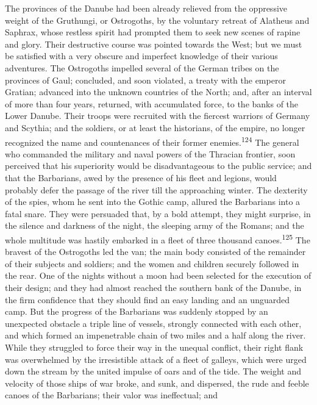 The provinces of the Danube had been already relieved from the
oppressive weight of the Gruthungi, or Ostrogoths, by the
voluntary retreat of Alatheus and Saphrax, whose restless spirit
had prompted them to seek new scenes of rapine and glory. Their
destructive course was pointed towards the West; but we must be
satisfied with a very obscure and imperfect knowledge of their
various adventures. The Ostrogoths impelled several of the German
tribes on the provinces of Gaul; concluded, and soon violated, a
treaty with the emperor Gratian; advanced into the unknown
countries of the North; and, after an interval of more than four
years, returned, with accumulated force, to the banks of the
Lower Danube. Their troops were recruited with the fiercest
warriors of Germany and Scythia; and the soldiers, or at least
the historians, of the empire, no longer recognized the name and
countenances of their former enemies.\textsuperscript{124} The general who
commanded the military and naval powers of the Thracian frontier,
soon perceived that his superiority would be disadvantageous to
the public service; and that the Barbarians, awed by the presence
of his fleet and legions, would probably defer the passage of the
river till the approaching winter. The dexterity of the spies,
whom he sent into the Gothic camp, allured the Barbarians into a
fatal snare. They were persuaded that, by a bold attempt, they
might surprise, in the silence and darkness of the night, the
sleeping army of the Romans; and the whole multitude was hastily
embarked in a fleet of three thousand canoes.\textsuperscript{125} The bravest of
the Ostrogoths led the van; the main body consisted of the
remainder of their subjects and soldiers; and the women and
children securely followed in the rear. One of the nights without
a moon had been selected for the execution of their design; and
they had almost reached the southern bank of the Danube, in the
firm confidence that they should find an easy landing and an
unguarded camp. But the progress of the Barbarians was suddenly
stopped by an unexpected obstacle a triple line of vessels,
strongly connected with each other, and which formed an
impenetrable chain of two miles and a half along the river. While
they struggled to force their way in the unequal conflict, their
right flank was overwhelmed by the irresistible attack of a fleet
of galleys, which were urged down the stream by the united
impulse of oars and of the tide. The weight and velocity of those
ships of war broke, and sunk, and dispersed, the rude and feeble
canoes of the Barbarians; their valor was ineffectual; and

